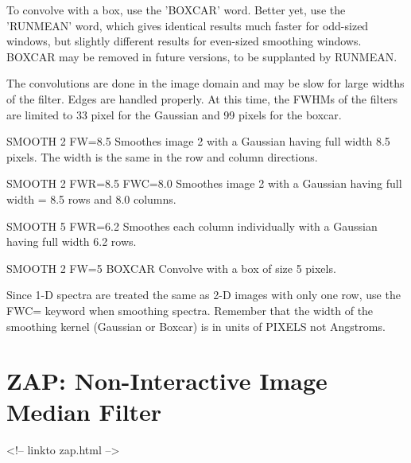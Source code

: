 To convolve with a box, use the 'BOXCAR' word. Better yet, use the
'RUNMEAN' word, which gives identical results much faster for odd-sized
windows, but slightly different results for even-sized smoothing windows.
BOXCAR may be removed in future versions, to be supplanted by RUNMEAN.

The convolutions are done in the image domain and may be slow for large
widths of the filter.  Edges are handled properly.  At this time, the
FWHMs of the filters are limited to 33 pixel for the Gaussian and 99
pixels for the boxcar.

\begin{example}
  \item[SMOOTH 2 FW=8.5\hfill]{Smoothes image 2 with a Gaussian having
       full width 8.5 pixels.  The width is
       the same in the row and column directions.}
  \item[SMOOTH 2 FWR=8.5 FWC=8.0\hfill]{Smoothes image 2 with a Gaussian
       having full width = 8.5 rows and 8.0 columns.}
  \item[SMOOTH 5 FWR=6.2\hfill]{Smoothes each column individually with a
       Gaussian having full width 6.2 rows.}
  \item[SMOOTH 2 FW=5 BOXCAR\hfill]{Convolve with a box of size 5 pixels.}
\end{example}

Since 1-D spectra are treated the same as 2-D images with only one row, use
the FWC= keyword when smoothing spectra.  Remember that the width of the
smoothing kernel (Gaussian or Boxcar) is in units of PIXELS not Angstroms.

\section{ZAP: Non-Interactive Image Median Filter}
\begin{rawhtml}
<!-- linkto zap.html -->
\end{rawhtml}

